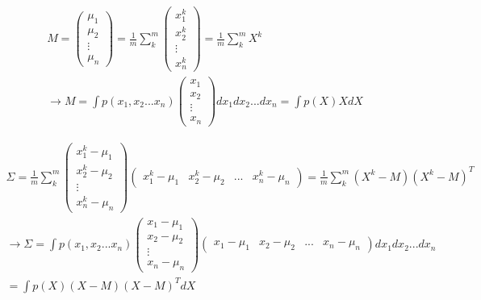 \begin{gather}
    M=\begin{pmatrix}
        \mu_{1}\\
        \mu_{2}\\
        \vdots \\
        \mu_{n}
    \end{pmatrix}
    =\frac{1}{m}\sum_{k}^{m}
    \begin{pmatrix}
        x_{1}^{k}\\
        x_{2}^{k}\\
        \vdots \\
        x_{n}^{k}
    \end{pmatrix}
    =\frac{1}{m}\sum_{k}^{m} X^{k}\\
    \rightarrow M = \int p(x_{1},x_{2}...x_{n})
    \begin{pmatrix}
        x_{1}\\
        x_{2}\\
        \vdots \\
        x_{n}
    \end{pmatrix}
    dx_{1}dx_{2}...dx_{n}
    = \int p(X) X dX
\end{gather}

\begin{gather}
    \Sigma = \frac{1}{m} \sum_{k}^{m}
    \begin{pmatrix}
        x_{1}^{k}-\mu_{1}\\
        x_{2}^{k}-\mu_{2}\\
        \vdots \\
        x_{n}^{k}-\mu_{n}
    \end{pmatrix}
    \begin{pmatrix}
        x_{1}^{k}-\mu_{1}&x_{2}^{k}-\mu_{2}&...&x_{n}^{k}-\mu_{n}
    \end{pmatrix}
    =\frac{1}{m} \sum_{k}^{m} (X^{k}-M)(X^{k}-M)^{T}\\
    \rightarrow \Sigma = \int p(x_{1},x_{2}...x_{n})
    \begin{pmatrix}
        x_{1}-\mu_{1}\\
        x_{2}-\mu_{2}\\
        \vdots \\
        x_{n}-\mu_{n}
    \end{pmatrix}
    \begin{pmatrix}
        x_{1}-\mu_{1}&x_{2}-\mu_{2}&...&x_{n}-\mu_{n}
    \end{pmatrix}
    dx_{1}dx_{2}...dx_{n}\\
    = \int p(X) (X-M)(X-M)^{T} dX
\end{gather}

